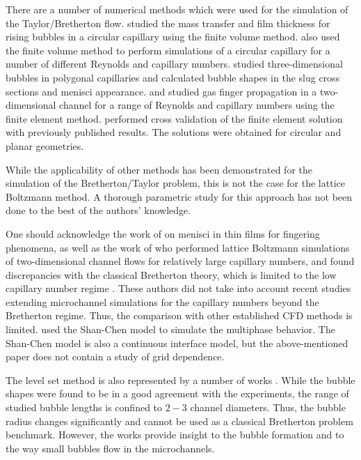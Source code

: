 \documentclass[preprint,12pt]{elsarticle}
\begin{document}
There are a number of numerical methods which
were used for the simulation of the Taylor/Bretherton flow.
\citet{vanbaten-circular} studied the mass transfer and film
thickness for rising bubbles in a circular capillary using the finite volume method.
\citet{kreutzer-pressure-drop} also used the finite volume method to perform
simulations of a circular capillary for a number of different
Reynolds and capillary numbers. \citeauthor{wong-films} \cite{wong-films,wong-pressure} studied
three-dimensional bubbles in
polygonal capillaries and calculated bubble shapes in the
slug cross sections and menisci appearance.
\citet{heil-bretherton} and \citet{ingham-plates} studied gas finger propagation in
a two-dimensional channel for a range of Reynolds and capillary
numbers using the finite element method. \citet{giavedoni-numerical} performed cross validation of the
finite element solution with previously published results.
The solutions were obtained for circular and planar geometries.

While the applicability of other methods has been demonstrated for the
simulation of the Bretherton/Taylor problem, this is not the case for
the lattice Boltzmann method. A thorough parametric study for this approach
has not been done to the best of the authors' knowledge.

One should acknowledge the work of \citet{pagonabarraga-fingers} on menisci
in thin films for fingering phenomena, as well as the work of \citet{sehgal-microchannel} who
performed lattice Boltzmann
simulations of two-dimensional channel flows for relatively large capillary numbers, and
found discrepancies with the classical Bretherton theory, which
is limited to the low capillary number regime \cite{giavedoni-numerical}. These authors did not take
into
account recent studies extending microchannel simulations for the capillary numbers
beyond the Bretherton regime. Thus, the comparison with other established CFD methods is limited.
\citeauthor{sehgal-microchannel} used the Shan-Chen model \cite{Shan-chen:extended} to simulate the
multiphase behavior. The Shan-Chen model is also a
continuous interface model, but the above-mentioned paper does not contain a study of grid dependence.

{\color{red}
The level set method is also represented by a number of works \cite{fukugata-levelset,
lakehal-micro, carlson-comparison}. While the bubble shapes  were found to be in a good agreement
with the experiments, the range of studied bubble lengths is confined to $2-3$ channel diameters.
Thus, the bubble radius changes significantly and cannot be used as a classical Bretherton problem
benchmark. However, the works provide insight to the bubble formation and to the way small bubbles
flow in the
microchannels.} 
\end{document}
